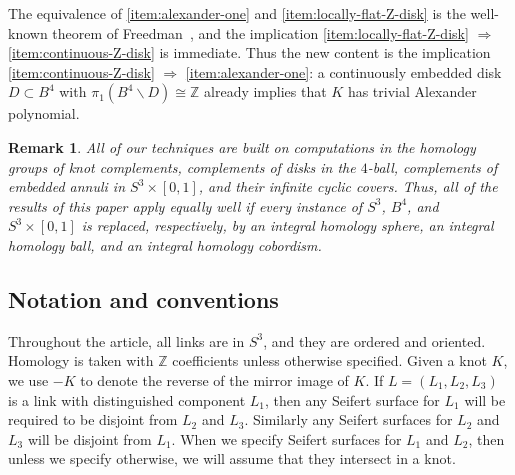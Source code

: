 \documentclass[a4paper, 11pt]{amsart}
\newcommand{\blue}{\textcolor{blue}}
\newcommand{\red}{\textcolor{red}}
\newcommand{\JP}[1]{[JP] \blue{#1}}
\newcommand{\chris}[1]{\red{[Chris] #1}}
\newtheorem{remark}[theorem]{Remark}
\theoremstyle{definition}
\begin{document}
The equivalence of \eqref{item:alexander-one} and \eqref{item:locally-flat-Z-disk}
is the well-known theorem of Freedman~\cite{Freedman1, Freedman-Quinn:1990-1, Garoufalidis-Teichner:2004-1},
and the implication \eqref{item:locally-flat-Z-disk} $\Rightarrow$
\eqref{item:continuous-Z-disk} is immediate. Thus the new content is the implication
\eqref{item:continuous-Z-disk} $\Rightarrow$ \eqref{item:alexander-one}: a continuously
embedded disk $D\subset B^4$ with
$\pi_1(B^4\smallsetminus D)\cong \mathbb{Z}$
already implies that $K$ has trivial Alexander polynomial.

\begin{remark}\label{rmk:homology-sphere}
All of our techniques are built on computations in the homology groups of knot
complements, complements of disks in the $4$-ball, complements of embedded
annuli in $S^3\times[0,1]$, and their infinite cyclic covers. Thus, all of the
results of this paper apply equally well if every instance of $S^3$, $B^4$, and
$S^3\times[0,1]$ is replaced, respectively, by an integral homology sphere, an
integral homology ball, and an integral homology cobordism.
\end{remark}


\subsection*{Notation and conventions}
Throughout the article, all links are in $S^3$, and they are ordered and oriented. Homology is taken with $\mathbb{Z}$ coefficients unless otherwise specified. Given a knot $K$, we use $-K$ to denote the reverse of the mirror image of $K$.  {If $L=(L_1,L_2,L_3)$ is a link with distinguished component $L_1$, then any Seifert surface for $L_1$ will be required to be disjoint from $L_2$ and $L_3$.  Similarly any Seifert surfaces for $L_2$ and $L_3$ will be disjoint from $L_1$.  When we specify Seifert surfaces for $L_1$ and $L_2$, then unless we specify otherwise,  we will assume that they intersect in a knot. }
\end{document}
